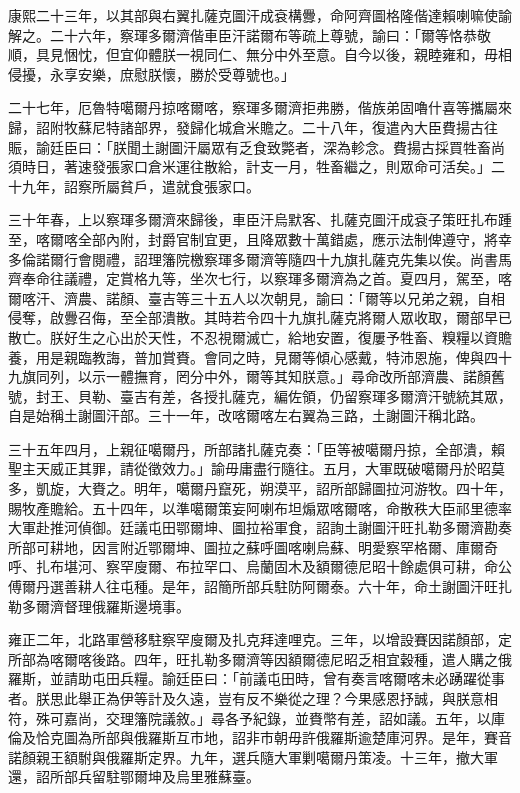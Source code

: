 \begin{pinyinscope}
康熙二十三年，以其部與右翼扎薩克圖汗成袞構釁，命阿齊圖格隆偕達賴喇嘛使諭解之。二十六年，察琿多爾濟偕車臣汗諾爾布等疏上尊號，諭曰：「爾等恪恭敬順，具見悃忱，但宜仰體朕一視同仁、無分中外至意。自今以後，親睦雍和，毋相侵擾，永享安樂，庶慰朕懷，勝於受尊號也。」

二十七年，厄魯特噶爾丹掠喀爾喀，察琿多爾濟拒弗勝，偕族弟固嚕什喜等攜屬來歸，詔附牧蘇尼特諸部界，發歸化城倉米贍之。二十八年，復遣內大臣費揚古往賑，諭廷臣曰：「朕聞土謝圖汗屬眾有乏食致斃者，深為軫念。費揚古採買牲畜尚須時日，著速發張家口倉米運往散給，計支一月，牲畜繼之，則眾命可活矣。」二十九年，詔察所屬貧戶，遣就食張家口。

三十年春，上以察琿多爾濟來歸後，車臣汗烏默客、扎薩克圖汗成袞子策旺扎布踵至，喀爾喀全部內附，封爵官制宜更，且降眾數十萬錯處，應示法制俾遵守，將幸多倫諾爾行會閱禮，詔理籓院檄察琿多爾濟等隨四十九旗扎薩克先集以俟。尚書馬齊奉命往議禮，定賞格九等，坐次七行，以察琿多爾濟為之首。夏四月，駕至，喀爾喀汗、濟農、諾顏、臺吉等三十五人以次朝見，諭曰：「爾等以兄弟之親，自相侵奪，啟釁召侮，至全部潰散。其時若令四十九旗扎薩克將爾人眾收取，爾部早已散亡。朕好生之心出於天性，不忍視爾滅亡，給地安置，復屢予牲畜、糗糧以資贍養，用是親臨教誨，普加賞賚。會同之時，見爾等傾心感戴，特沛恩施，俾與四十九旗同列，以示一體撫育，罔分中外，爾等其知朕意。」尋命改所部濟農、諾顏舊號，封王、貝勒、臺吉有差，各授扎薩克，編佐領，仍留察琿多爾濟汗號統其眾，自是始稱土謝圖汗部。三十一年，改喀爾喀左右翼為三路，土謝圖汗稱北路。

三十五年四月，上親征噶爾丹，所部諸扎薩克奏：「臣等被噶爾丹掠，全部潰，賴聖主天威正其罪，請從徵效力。」諭毋庸盡行隨往。五月，大軍既破噶爾丹於昭莫多，凱旋，大賚之。明年，噶爾丹竄死，朔漠平，詔所部歸圖拉河游牧。四十年，賜牧產贍給。五十四年，以準噶爾策妄阿喇布坦煽眾喀爾喀，命散秩大臣祁里德率大軍赴推河偵御。廷議屯田鄂爾坤、圖拉裕軍食，詔詢土謝圖汗旺扎勒多爾濟勘奏所部可耕地，因言附近鄂爾坤、圖拉之蘇呼圖喀喇烏蘇、明愛察罕格爾、庫爾奇呼、扎布堪河、察罕廋爾、布拉罕口、烏蘭固木及額爾德尼昭十餘處俱可耕，命公傅爾丹選善耕人往屯種。是年，詔簡所部兵駐防阿爾泰。六十年，命土謝圖汗旺扎勒多爾濟督理俄羅斯邊境事。

雍正二年，北路軍營移駐察罕廋爾及扎克拜達哩克。三年，以增設賽因諾顏部，定所部為喀爾喀後路。四年，旺扎勒多爾濟等因額爾德尼昭乏相宜穀種，遣人購之俄羅斯，並請助屯田兵糧。諭廷臣曰：「前議屯田時，曾有奏言喀爾喀未必踴躍從事者。朕思此舉正為伊等計及久遠，豈有反不樂從之理？今果感恩抒誠，與朕意相符，殊可嘉尚，交理籓院議敘。」尋各予紀錄，並賚幣有差，詔如議。五年，以庫倫及恰克圖為所部與俄羅斯互市地，詔非市朝毋許俄羅斯逾楚庫河界。是年，賽音諾顏親王額駙與俄羅斯定界。九年，選兵隨大軍剿噶爾丹策凌。十三年，撤大軍還，詔所部兵留駐鄂爾坤及烏里雅蘇臺。


\end{pinyinscope}
